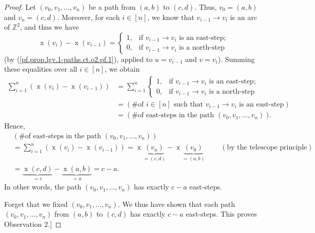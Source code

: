 \begin{definition}
\begin{proof}
Let $\left(  v_{0},v_{1},\ldots,v_{n}\right)  $ be a path from $\left(
a,b\right)  $ to $\left(  c,d\right)  $. Thus, $v_{0}=\left(  a,b\right)  $
and $v_{n}=\left(  c,d\right)  $. Moreover, for each $i\in\left[  n\right]  $,
we know that $v_{i-1}\rightarrow v_{i}$ is an arc of $\mathbb{Z}^{2}$, and
thus we have%
\[
\operatorname*{x}\left(  v_{i}\right)  -\operatorname*{x}\left(
v_{i-1}\right)  =%
\begin{cases}
1, & \text{if }v_{i-1}\rightarrow v_{i}\text{ is an east-step;}\\
0, & \text{if }v_{i-1}\rightarrow v_{i}\text{ is a north-step}%
\end{cases}
\]
(by (\ref{pf.prop.lgv.1-paths.ct.o2.pf.1}), applied to $u=v_{i-1}$ and
$v=v_{i}$). Summing these equalities over all $i\in\left[  n\right]  $, we
obtain%
\begin{align*}
\sum_{i=1}^{n}\left(  \operatorname*{x}\left(  v_{i}\right)
-\operatorname*{x}\left(  v_{i-1}\right)  \right)   &  =\sum_{i=1}^{n}%
\begin{cases}
1, & \text{if }v_{i-1}\rightarrow v_{i}\text{ is an east-step;}\\
0, & \text{if }v_{i-1}\rightarrow v_{i}\text{ is a north-step}%
\end{cases}
\\
&  =\left(  \text{\# of }i\in\left[  n\right]  \text{ such that }%
v_{i-1}\rightarrow v_{i}\text{ is an east-step}\right) \\
&  =\left(  \text{\# of east-steps in the path }\left(  v_{0},v_{1}%
,\ldots,v_{n}\right)  \right)  .
\end{align*}
Hence,%
\begin{align*}
&  \left(  \text{\# of east-steps in the path }\left(  v_{0},v_{1}%
,\ldots,v_{n}\right)  \right) \\
&  =\sum_{i=1}^{n}\left(  \operatorname*{x}\left(  v_{i}\right)
-\operatorname*{x}\left(  v_{i-1}\right)  \right)  =\operatorname*{x}%
\underbrace{\left(  v_{n}\right)  }_{=\left(  c,d\right)  }-\operatorname*{x}%
\underbrace{\left(  v_{0}\right)  }_{=\left(  a,b\right)  }%
\ \ \ \ \ \ \ \ \ \ \left(  \text{by the telescope principle}\right) \\
&  =\underbrace{\operatorname*{x}\left(  c,d\right)  }_{=c}%
-\underbrace{\operatorname*{x}\left(  a,b\right)  }_{=a}=c-a.
\end{align*}
In other words, the path $\left(  v_{0},v_{1},\ldots,v_{n}\right)  $ has
exactly $c-a$ east-steps.

Forget that we fixed $\left(  v_{0},v_{1},\ldots,v_{n}\right)  $. We thus have
shown that each path $\left(  v_{0},v_{1},\ldots,v_{n}\right)  $ from $\left(
a,b\right)  $ to $\left(  c,d\right)  $ has exactly $c-a$ east-steps. This
proves Observation 2.] \medskip


\end{proof}
\end{definition}
